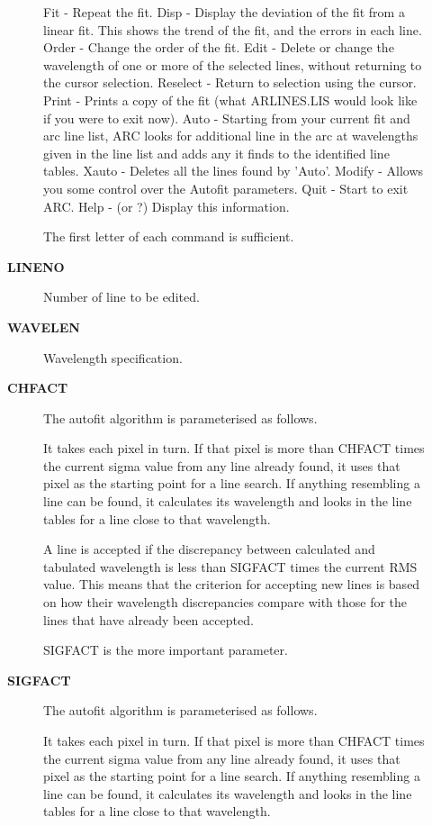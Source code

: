 \begin{description}
\begin{description}
   Fit      - Repeat the fit.
   Disp     - Display the deviation of the fit from a linear fit.
              This shows the trend of the fit, and the errors in
              each line.
   Order    - Change the order of the fit.
   Edit     - Delete or change the wavelength of one or more of
              the selected lines, without returning to the cursor
              selection.
   Reselect - Return to selection using the cursor.
   Print    - Prints a copy of the fit (what ARLINES.LIS would look
              like if you were to exit now).
   Auto     - Starting from your current fit and arc line list, ARC
              looks for additional line in the arc at wavelengths
              given in the line list and adds any it finds to the
              identified line tables.
   Xauto    - Deletes all the lines found by 'Auto'.
   Modify   - Allows you some control over the Autofit parameters.
   Quit     - Start to exit ARC.
   Help     - (or ?) Display this information.

 The first letter of each command is sufficient.
\item [\textbf{LINENO}]
 Number of line to be edited.
\item [\textbf{WAVELEN}]
 Wavelength specification.
\item [\textbf{CHFACT}]
 The autofit algorithm is parameterised as follows.

 It takes each pixel in turn.  If that pixel is more than CHFACT
 times the current sigma value from any line already found, it uses
 that pixel as the starting point for a line search.  If anything
 resembling a line can be found, it calculates its wavelength and
 looks in the line tables for a line close to that wavelength.

 A line is accepted if the discrepancy between calculated and
 tabulated wavelength is less than SIGFACT times the current RMS
 value.  This means that the criterion for accepting new lines
 is based on how their wavelength discrepancies compare with those for
 the lines that have already been accepted.

 SIGFACT is the more important parameter.
\item [\textbf{SIGFACT}]
 The autofit algorithm is parameterised as follows.

 It takes each pixel in turn.  If that pixel is more than CHFACT
 times the current sigma value from any line already found, it uses
 that pixel as the starting point for a line search.  If anything
 resembling a line can be found, it calculates its wavelength and
 looks in the line tables for a line close to that wavelength.


\end{description}
\end{description}
